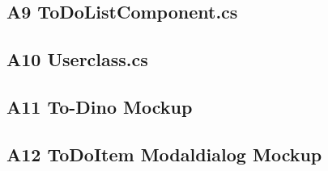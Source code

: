 {	\subsection{A9 ToDoListComponent.cs}
	\label{subsec:a9}
	\anhangNeun
	
	\subsection{A10 Userclass.cs}
	\label{subsec:a10}
	\anhangZehn
	
	\subsection{A11 To-Dino Mockup}
	\label{subsec:a11}
	\anhangElf
	
	\subsection{A12 ToDoItem Modaldialog Mockup}
	\label{subsec:a12}
	\anhangZwoelf
}